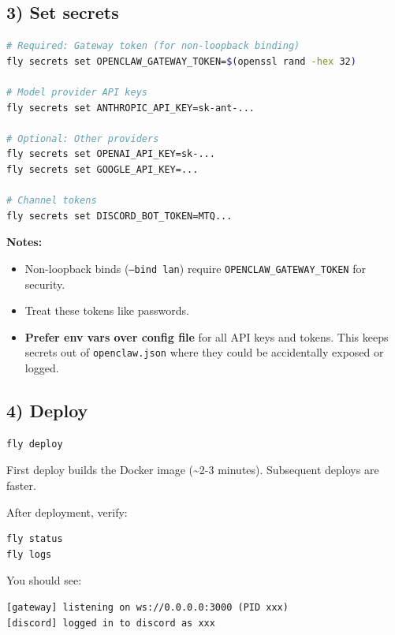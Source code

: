 \subsection{3) Set secrets}


\begin{lstlisting}[language=bash]
# Required: Gateway token (for non-loopback binding)
fly secrets set OPENCLAW_GATEWAY_TOKEN=$(openssl rand -hex 32)

# Model provider API keys
fly secrets set ANTHROPIC_API_KEY=sk-ant-...

# Optional: Other providers
fly secrets set OPENAI_API_KEY=sk-...
fly secrets set GOOGLE_API_KEY=...

# Channel tokens
fly secrets set DISCORD_BOT_TOKEN=MTQ...
\end{lstlisting}


\textbf{Notes:}

\begin{itemize}
  \item Non-loopback binds (\texttt{--bind lan}) require \texttt{OPENCLAW\_GATEWAY\_TOKEN} for security.
  \item Treat these tokens like passwords.
  \item \textbf{Prefer env vars over config file} for all API keys and tokens. This keeps secrets out of \texttt{openclaw.json} where they could be accidentally exposed or logged.
\end{itemize}


\subsection{4) Deploy}


\begin{lstlisting}[language=bash]
fly deploy
\end{lstlisting}


First deploy builds the Docker image (\textasciitilde{}2-3 minutes). Subsequent deploys are faster.

After deployment, verify:

\begin{lstlisting}[language=bash]
fly status
fly logs
\end{lstlisting}


You should see:

\begin{lstlisting}
[gateway] listening on ws://0.0.0.0:3000 (PID xxx)
[discord] logged in to discord as xxx
\end{lstlisting}


